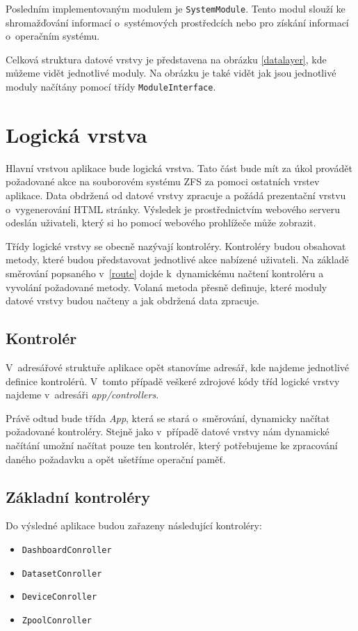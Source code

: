     Posledním implementovaným modulem je \verb|SystemModule|. Tento modul slouží ke shromažďování informací o~systémových prostředcích nebo pro získání informací o~operačním systému.

    Celková struktura datové vrstvy je představena na obrázku \ref{datalayer}, kde můžeme vidět jednotlivé moduly. Na obrázku je také vidět jak jsou jednotlivé moduly načítány pomocí třídy \verb|ModuleInterface|.

\section{Logická vrstva}
Hlavní vrstvou aplikace bude logická vrstva. Tato část bude mít za úkol provádět požadované akce na souborovém systému ZFS za pomoci ostatních vrstev aplikace. Data obdržená od datové vrstvy zpracuje a požádá prezentační vrstvu o~vygenerování HTML stránky. Výsledek je prostřednictvím webového serveru odeslán uživateli, který si ho pomocí webového prohlížeče může zobrazit.

Třídy logické vrstvy se obecně nazývají kontroléry. Kontroléry budou obsahovat metody, které budou představovat jednotlivé akce nabízené uživateli. Na základě směrování popsaného v~\ref{route} dojde k~dynamickému načtení kontroléru a vyvolání požadované metody. Volaná metoda přesně definuje, které moduly datové vrstvy budou načteny a jak obdržená data zpracuje.
    \subsection{Kontrolér}
    V~adresářové struktuře aplikace opět stanovíme adresář, kde najdeme jednotlivé definice kontrolérů. V~tomto případě veškeré zdrojové kódy tříd logické vrstvy najdeme v~adresáři \emph{app/controllers}.

    Právě odtud bude třída \emph{App}, která se stará o~směrování, dynamicky načítat požadované kontroléry. Stejně jako v~případě datové vrstvy nám dynamické načítání umožní načítat pouze ten kontrolér, který potřebujeme ke zpracování daného požadavku a opět ušetříme operační paměť.

    \subsection{Základní kontroléry}
    Do výsledné aplikace budou zařazeny následující kontroléry:
    \begin{itemize}
      \item \verb|DashboardConroller|
      \item \verb|DatasetConroller|
      \item \verb|DeviceConroller|
      \item \verb|ZpoolConroller|
    \end{itemize}

